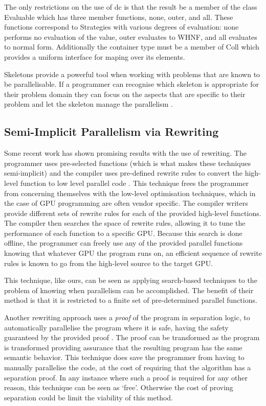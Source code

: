 The only restrictions on the use of \<dc\> is that the result be a member of
the class \<Evaluable\> which has three member functions, \<none\>, \<outer\>,
and \<all\>. These functions correspond to Strategies with various degrees of
evaluation: \<none\> performs no evaluation of the value, \<outer\> evaluates
to WHNF, and \<all\> evaluates to normal form. Additionally the container type
must be a member of \<Coll\> which provides a uniform interface for \<map\>ing
over its elements.

Skeletons provide a powerful tool when working with problems that are known to
be parallelisable. If a programmer can recognise which skeleton is appropriate
for their problem domain they can focus on the aspects that are specific to
their problem and let the skeleton manage the parallelism \citep{skeletons}.


\subsection{Semi-Implicit Parallelism via Rewriting}


Some recent work has shown promising results with the use of rewriting. The
programmer uses pre-selected functions (which is what makes these techniques
semi-implicit) and the compiler uses pre-defined rewrite rules to convert the
high-level function to low level parallel code \citep{SteuwerPortable}. This
technique frees the programmer from concerning themselves with the low-level
optimisation techniques, which in the case of GPU programming are often vendor
specific. The compiler writers provide different sets of rewrite rules for each
of the provided high-level functions. The compiler then searches the space of
rewrite rules, allowing it to tune the performance of each function to a
specific GPU. Because this search is done offline, the programmer can freely
use any of the provided parallel functions knowing that whatever GPU the
program runs on, an efficient sequence of rewrite rules is known to go from the
high-level source to the target GPU.

This technique, like ours, can be seen as applying search-based techniques to
the problem of knowing when parallelism can be accomplished. The benefit of
their method is that it is restricted to a finite set of pre-determined
parallel functions.

Another rewriting approach uses a \emph{proof} of the program in separation
logic, to automatically parallelise the program where it is safe, having the
safety guaranteed by the provided proof \citep{hurlinProof}. The proof can be
transformed as the program is transformed providing assurance that the
resulting program has the same semantic behavior. This technique does save the
programmer from having to manually parallelise the code, at the cost of
requiring that the algorithm has a separation proof. In any instance where such
a proof is required for any other reason, this technique can be seen as `free'.
Otherwise the cost of proving separation could be limit the viability of this
method.


